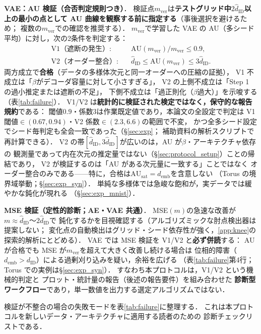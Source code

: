 \documentclass[11pt,a4paper]{jsarticle}
\newcommand{\dID}{d_{\mathrm{ID}}}
\newcommand{\hatdID}{\hat{d}_{\mathrm{ID}}}
\newcommand{\AUsat}{\mathrm{AU}_{\mathrm{sat}}}
\newcommand{\demb}{d_{\mathrm{emb}}}
\begin{document}
\textbf{VAE：AU 検証（合否判定規則つき）}．
検証点$m_{\mathrm{ver}}$は\textbf{テストグリッド中$2\hatdID$以上の最小の点として
AU 曲線を観察する前に指定する}（事後選択を避けるため；
複数の$m_{\mathrm{ver}}$での確認を推奨する）．
$m_{\mathrm{ver}}$で学習した VAE の AU（多シード平均）に対し，次の2条件を判定する：
\begin{align}
  \text{V1（遮断の発生）}:&\quad \mathrm{AU}(m_{\mathrm{ver}}) / m_{\mathrm{ver}} \leq 0.9,
  \label{eq:rule_v1}\\
  \text{V2（オーダー整合）}:&\quad \hatdID \leq \mathrm{AU}(m_{\mathrm{ver}}) \leq 3\hatdID.
  \label{eq:rule_v2}
\end{align}
両方成立で\textbf{合格}（データの多様体次元と同一オーダーへの圧縮の証拠），
V1 不成立は「$\beta$がデコーダ容量に対して小さすぎる」，
V2 の上側不成立は「Step 1 の過小推定または遮断の不足」，
下側不成立は「過正則化（$\beta$過大）」を示唆する（表\ref{tab:failure}）．
V1/V2 は\textbf{統計的に検証された検定ではなく，保守的な報告規約}である：
閾値$0.9$・係数$3$は作業既定値であり，本論文の全設定で判定は
V1 閾値$\in (0.67, 0.94)$・V2 係数$\in (2.3, 6.6)$の範囲で不変，
かつ全多シード設定でシード毎判定も全会一致であった（§\ref{sec:exp}；
補助資料の解析スクリプトで再計算できる）．
V2 の帯$[\hatdID, 3\hatdID]$が広いのは，AU が$\beta$・アーキテクチャ依存の
観測量であって内在次元の推定量ではない（§\ref{sec:protocol_setup}）ことの帰結であり，
V2 が検証するのは「AU がある次元量に一致する」ことではなく
オーダー整合のみである——特に，合格は$\AUsat = \demb$を含意しない
（Torus の境界域挙動；§\ref{sec:exp_syn}）．
単純な多様体では急峻な飽和が，実データでは緩やかな鈍化が現れる
（§\ref{sec:exp_mnist}）．

\textbf{MSE 検証（定性的診断；AE・VAE 共通）}．
MSE$(m)$の急速な改善が$m \approx \hatdID$〜$2\hatdID$で
鈍化するかを目視確認する（アルゴリズミックな肘点検出器は提案しない；
変化点の自動検出はグリッド・シード依存性が強く，\ref{app:knee}の
探索的解析にとどめる）．
VAE では MSE 検証を V1/V2 と\textbf{必ず併読}する：
AU が合格でも MSE が$m_{\mathrm{ver}}$を超えて大きく改善し続ける場合は
位相的障害（$\demb > \dID$）による過剰刈り込みを疑い，余裕を広げる
（表\ref{tab:failure}第4行；Torus での実例は§\ref{sec:exp_syn}）．
すなわち本プロトコルは，V1/V2 という機械的判定と
プロット・統計量の報告（後述の報告要件）を組み合わせた
\textbf{診断型ワークフロー}であり，単一数値を出力する選定アルゴリズムではない．

検証が不整合の場合の失敗モードを表\ref{tab:failure}に整理する．
これは本プロトコルを新しいデータ・アーキテクチャに適用する読者のための
診断チェックリストである．
\end{document}
